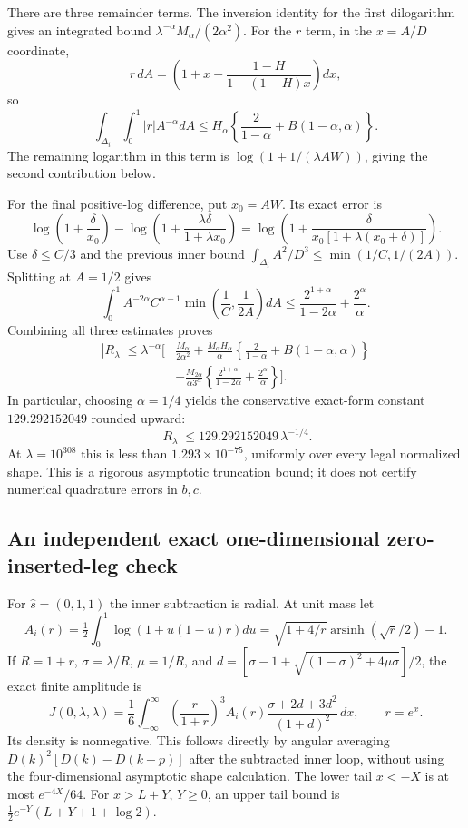 There are three remainder terms. The inversion identity for the first
dilogarithm gives an integrated bound
$\lambda^{-\alpha}M_\alpha/(2\alpha^2)$.
For the $r$ term, in the $x=A/D$ coordinate,
\[
 r\,dA=\left(1+x-\frac{1-H}{1-(1-H)x}\right)dx,
\]
so
\[
 \int_{\Delta_i}\int_0^1|r|A^{-\alpha}dA
 \le H_\alpha\left\{\frac2{1-\alpha}+B(1-\alpha,\alpha)\right\}.
\]
The remaining logarithm in this term is
$\log(1+1/(\lambda AW))$, giving the second contribution below.

For the final positive-log difference, put $x_0=AW$. Its exact error is
\[
 \log\left(1+\frac\delta{x_0}\right)
 -\log\left(1+\frac{\lambda\delta}{1+\lambda x_0}\right)
 =\log\left(1+\frac\delta{x_0[1+\lambda(x_0+\delta)]}\right).
\]
Use $\delta\le C/3$ and the previous inner bound
$\int_{\Delta_i}A^2/D^3\le\min(1/C,1/(2A))$. Splitting at $A=1/2$
gives
\[
 \int_0^1 A^{-2\alpha}C^{\alpha-1}
             \min\left(\frac1C,\frac1{2A}\right)dA
 \le\frac{2^{1+\alpha}}{1-2\alpha}+\frac{2^\alpha}{\alpha}.
\]
Combining all three estimates proves
\begin{align*}
 |R_\lambda|\le\lambda^{-\alpha}\Bigg[&
 \frac{M_\alpha}{2\alpha^2}
 +\frac{M_\alpha H_\alpha}{\alpha}
      \left\{\frac2{1-\alpha}+B(1-\alpha,\alpha)\right\}\\
 &+\frac{M_{2\alpha}}{\alpha3^\alpha}
       \left\{\frac{2^{1+\alpha}}{1-2\alpha}
                                      +\frac{2^\alpha}{\alpha}\right\}\Bigg].
\end{align*}
In particular, choosing $\alpha=1/4$ yields the conservative exact-form
constant $129.292152049$ rounded upward:
\[
 |R_\lambda|\le129.292152049\,\lambda^{-1/4}.
\]
At $\lambda=10^{308}$ this is less than $1.293\times10^{-75}$, uniformly
over every legal normalized shape. This is a rigorous asymptotic truncation
bound; it does not certify numerical quadrature errors in $b,c$.

\subsection{An independent exact one-dimensional zero-inserted-leg check}

For $\widehat s=(0,1,1)$ the inner subtraction is radial. At unit mass let
\[
 A_i(r)=\tfrac12\int_0^1\log(1+u(1-u)r)du
       =\sqrt{1+4/r}\operatorname{arsinh}(\sqrt r/2)-1.
\]
If $R=1+r$, $\sigma=\lambda/R$, $\mu=1/R$, and
$d=[\sigma-1+\sqrt{(1-\sigma)^2+4\mu\sigma}]/2$, the exact finite
amplitude is
\[
 J(0,\lambda,\lambda)=\frac16\int_{-\infty}^{\infty}
  \left(\frac r{1+r}\right)^3A_i(r)
  \frac{\sigma+2d+3d^2}{(1+d)^2}\,dx,
 \qquad r=e^x.
\]
Its density is nonnegative. This follows directly by angular averaging
$D(k)^2[D(k)-D(k+p)]$ after the subtracted inner loop, without using the
four-dimensional asymptotic shape calculation. The lower tail $x<-X$ is
at most $e^{-4X}/64$. For $x>L+Y$, $Y\ge0$, an upper tail bound is
$\tfrac12 e^{-Y}(L+Y+1+\log2)$.

